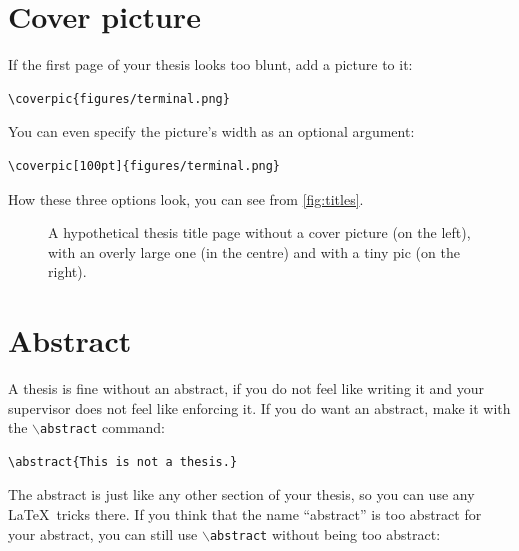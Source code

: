 \documentclass{uvamscse}
\newcommand{\cmd}[1]{\texttt{$\backslash$#1}}
\begin{document}
\section{Cover picture}

If the first page of your thesis looks too blunt, add a picture to it:

\begin{snippet}
\begin{verbatim}
\coverpic{figures/terminal.png}
\end{verbatim}
\end{snippet}

You can even specify the picture's width as an optional argument:

\begin{snippet}
\begin{verbatim}
\coverpic[100pt]{figures/terminal.png}
\end{verbatim}
\end{snippet}

How these three options look, you can see from \autoref{fig:titles}.

\begin{figure}[t]
  \hfill
  \hfill
  \caption{A hypothetical thesis title page without a cover picture (on the left), with an overly large one (in the centre) and with a tiny pic (on the right).}
  \label{fig:titles}
\end{figure}

\section{Abstract}

A thesis is fine without an abstract, if you do not feel like writing it and
your supervisor does not feel like enforcing it. If you do want an abstract,
make it with the \cmd{abstract} command:

\begin{snippet}
\begin{verbatim}
\abstract{This is not a thesis.}
\end{verbatim}
\end{snippet}

The abstract is just like any other section of your thesis, so you can use any
\LaTeX\ tricks there. If you think that the name ``abstract'' is too abstract
for your abstract, you can still use \cmd{abstract} without being too
abstract:
\end{document}
